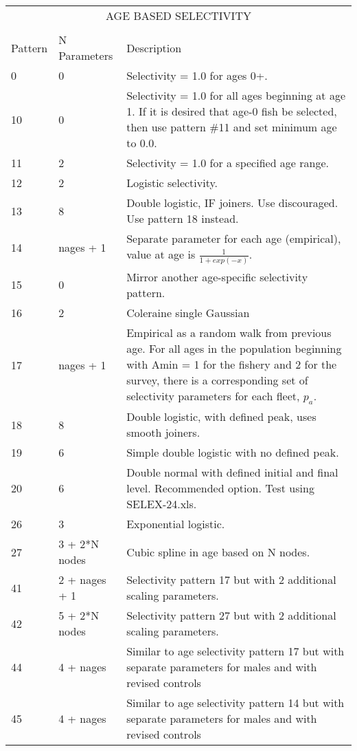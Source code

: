 \begin{center}
\begin{longtable}{p{2cm} p{3cm} p{10cm}}
		\hline
		\multicolumn{3}{c}{AGE BASED SELECTIVITY}\\
		   &   &  \\
		Pattern & N Parameters & Description \\
		\hline
		0  & 0 & Selectivity = 1.0 for ages 0+.\\
		10 & 0 & Selectivity = 1.0 for all ages beginning at age 1.  If it is desired that age-0 fish be selected, then use pattern \#11 and set minimum age to 0.0. \\
		11 & 2 & Selectivity = 1.0 for a specified age range.\\
		12 & 2 & Logistic selectivity.\\
		13 & 8 & Double logistic, IF joiners.  Use discouraged.  Use pattern 18 instead.\\
		14 & nages + 1 & Separate parameter for each age (empirical), value at age is $\frac{1}{1+exp(-x)}$. \\
		15 & 0 & Mirror another age-specific selectivity pattern.\\
		16 & 2 & Coleraine single Gaussian\\
		17 & nages + 1 & Empirical as a random walk from previous age.  For all ages in the population beginning with Amin = 1 for the fishery and 2 for the survey, there is a corresponding set of selectivity parameters for each fleet, $p_a$. \\
		18 & 8 & Double logistic, with defined peak, uses smooth joiners.  \\
		19 & 6 & Simple double logistic with no defined peak.\\
		20 & 6 & Double normal with defined initial and final level.  Recommended option. Test using SELEX-24.xls.\\
		26 & 3 & Exponential logistic.\\
		27 & 3 + 2*N nodes & Cubic spline in age based on N nodes.\\
		41 & 2 + nages + 1 & Selectivity pattern 17 but with 2 additional scaling parameters. \\
		42 & 5 + 2*N nodes & Selectivity pattern 27 but with 2 additional scaling parameters. \\
		44 & 4 + nages & Similar to age selectivity pattern 17 but with separate parameters for males and with revised controls \\
		45 & 4 + nages & Similar to age selectivity pattern 14 but with separate parameters for males and with revised controls \\
		\hline
	\end{longtable}
\end{center}


